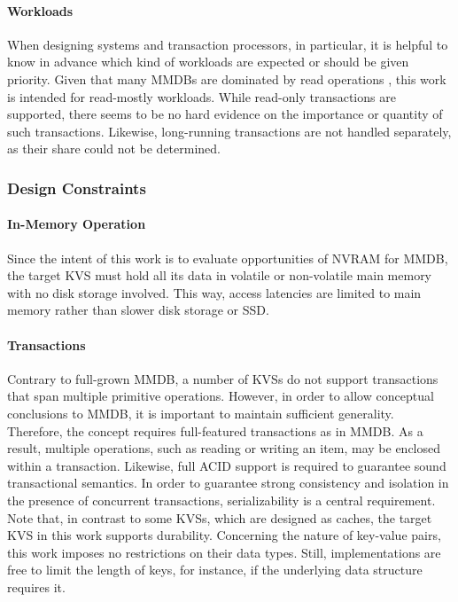 \paragraph{Workloads}

When designing systems and transaction processors, in particular, it is helpful
to know in advance which kind of workloads are expected or should be given
priority. Given that many \acp{MMDB} are dominated by read operations
\cite{andrei2017sap}, this work is intended for read-mostly workloads. While
read-only transactions are supported, there seems to be no hard evidence on the
importance or quantity of such transactions. Likewise, long-running transactions
are not handled separately, as their share could not be determined.

\subsubsection{Design Constraints}

\paragraph{In-Memory Operation}

Since the intent of this work is to evaluate opportunities of \ac{NVRAM} for
\ac{MMDB}, the target \ac{KVS} must hold all its data in volatile or
non-volatile main memory with no disk storage involved. This way, access
latencies are limited to main memory rather than slower disk storage or
\ac{SSD}.

\paragraph{Transactions}

Contrary to full-grown \ac{MMDB}, a number of \acp{KVS} do not support
transactions that span multiple primitive operations. However, in order to allow
conceptual conclusions to \ac{MMDB}, it is important to maintain sufficient
generality. Therefore, the concept requires full-featured transactions as in
\ac{MMDB}. As a result, multiple operations, such as reading or writing an item,
may be enclosed within a transaction. Likewise, full ACID support is required to
guarantee sound transactional semantics. In order to guarantee strong
consistency and isolation in the presence of concurrent transactions,
serializability is a central requirement. Note that, in contrast to some
\acp{KVS}, which are designed as caches, the target \ac{KVS} in this work
supports durability. Concerning the nature of key-value pairs, this work imposes
no restrictions on their data types. Still, implementations are free to limit
the length of keys, for instance, if the underlying data structure requires it.

